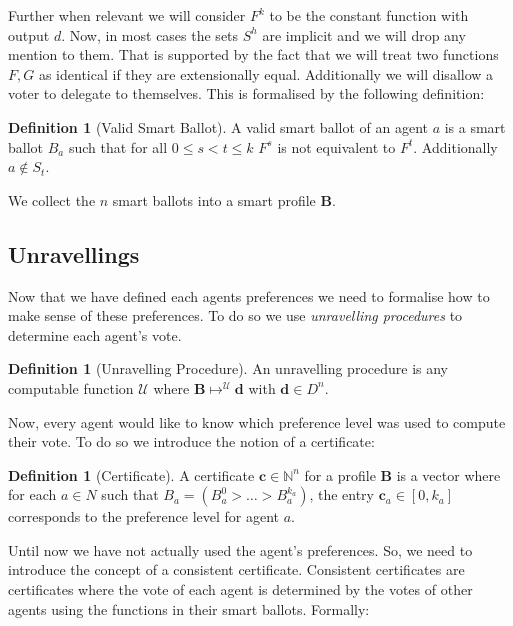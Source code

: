 \documentclass[11pt,a4paper, titlepage]{article}
\theoremstyle{definition}
\newtheorem{definition}[theorem]{Definition}
\let\vec\mathbf
\begin{document}
Further when relevant we will consider $F^{k}$ to be the constant function with output $d$. Now, in most cases the sets $S^h$ are implicit and we will drop any mention to them. That is supported by the fact that we will treat two functions $F, G$ as identical if they are extensionally equal. Additionally we will disallow a voter to delegate to themselves. This is formalised by the following definition:

\begin{definition}[Valid Smart Ballot]
    A valid smart ballot of an agent $a$ is a smart ballot $B_a$ such that for all $ 0 \leq s < t \leq k$ $F^s$ is not equivalent to $F^t$. Additionally $a \notin S_t$.
\end{definition}


We collect the $n$ smart ballots into a smart profile $\mathbf{B}$.

\subsection{Unravellings}

Now that we have defined each agents preferences we need to formalise how to make sense of these preferences. To do so we use \emph{unravelling procedures} to determine each agent's vote.

\begin{definition}[Unravelling Procedure]
    An unravelling procedure is any computable function $\mathcal{U}$ where $\mathbf{B} \mapsto^\mathcal{U} \vec{d}$ with $\vec{d} \in D^n$.


\end{definition}

Now, every agent would like to know which preference level was used to compute their vote. To do so we introduce the notion of a certificate:

\begin{definition}[Certificate]
    A certificate $\mathbf{c} \in \mathbb{N}^n$ for a profile $\mathbf{B}$ is a vector where for each $a \in N$ such that $B_a = (B_a^0 > \ldots > B_a^{k_a})$, the entry $\mathbf{c}_a \in [0, k_a]$ corresponds to the preference level for agent $a$.  
\end{definition}

Until now we have not actually used the agent's preferences. So, we need to introduce the concept of a consistent certificate. Consistent certificates are certificates where the vote of each agent is determined by the votes of other agents using the functions in their smart ballots. Formally:
\end{document}
